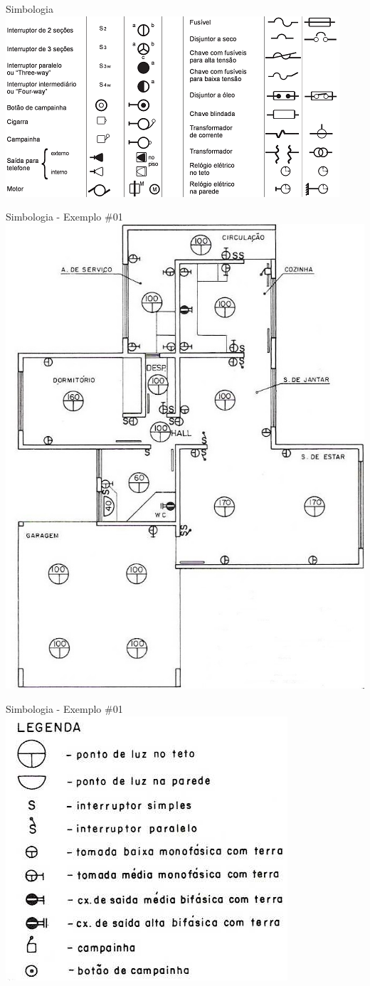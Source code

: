 \begin{frame}{Simbologia}
	\centering
	\includegraphics[width=1\linewidth]{Figuras/Ch05/fig2}
\end{frame}


\begin{frame}{Simbologia - Exemplo \#01}
	\centering
	\includegraphics[width=0.5\linewidth]{Figuras/Ch05/fig3}
\end{frame}


\begin{frame}{Simbologia - Exemplo \#01}
	\centering
	\includegraphics[width=0.7\linewidth]{Figuras/Ch05/fig4}
\end{frame}


